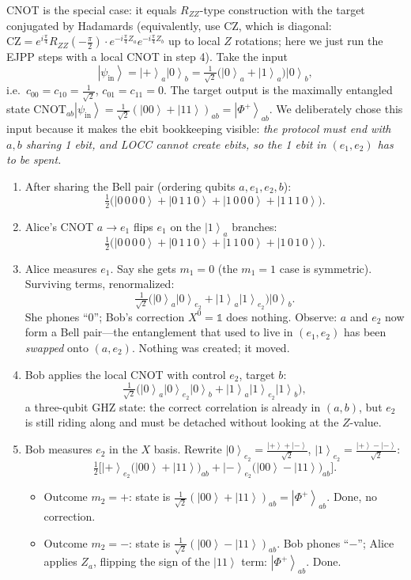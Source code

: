\documentclass[11pt]{article}
\newcommand{\ket}[1]{\left|#1\right\rangle}
\newcommand{\Phip}{\ket{\Phi^{+}}}
\newcommand{\RZZ}{R_{ZZ}}
\begin{document}
CNOT is the special case: it equals $\RZZ$-type construction with the target
conjugated by Hadamards (equivalently, use CZ, which is diagonal:
$\mathrm{CZ} = e^{i\frac{\pi}{4}} \RZZ(-\tfrac{\pi}{2})
\cdot e^{-i\frac{\pi}{4}Z_a} e^{-i\frac{\pi}{4}Z_b}$ up to local $Z$
rotations; here we just run the EJPP steps with a local CNOT in step 4).
Take the input
\[
\ket{\psi_{\text{in}}}
 = \ket{+}_a \ket{0}_b
 = \tfrac{1}{\sqrt 2}\big(\ket{0}_a + \ket{1}_a\big)\ket{0}_b ,
\]
i.e.\ $c_{00} = c_{10} = \tfrac{1}{\sqrt2}$, $c_{01} = c_{11} = 0$.
The target output is the maximally entangled state
$\mathrm{CNOT}_{ab}\ket{\psi_{\text{in}}}
 = \tfrac{1}{\sqrt2}(\ket{00}+\ket{11})_{ab} = \Phip_{ab}$.
We deliberately chose this input because it makes the ebit bookkeeping
visible: \emph{the protocol must end with $a,b$ sharing 1 ebit, and LOCC
cannot create ebits, so the 1 ebit in $(e_1,e_2)$ has to be spent.}

\begin{enumerate}[leftmargin=2em, itemsep=0.5em]
\item After sharing the Bell pair (ordering qubits $a, e_1, e_2, b$):
\[
\tfrac{1}{2}\Big(
 \ket{0\,0\,0\,0} + \ket{0\,1\,1\,0} + \ket{1\,0\,0\,0} + \ket{1\,1\,1\,0}
\Big).
\]
\item Alice's CNOT $a \to e_1$ flips $e_1$ on the $\ket{1}_a$ branches:
\[
\tfrac{1}{2}\Big(
 \ket{0\,0\,0\,0} + \ket{0\,1\,1\,0} + \ket{1\,1\,0\,0} + \ket{1\,0\,1\,0}
\Big).
\]
\item Alice measures $e_1$. Say she gets $m_1 = 0$ (the $m_1 = 1$ case is
symmetric). Surviving terms, renormalized:
\[
\tfrac{1}{\sqrt2}\Big(\ket{0}_a \ket{0}_{e_2} + \ket{1}_a \ket{1}_{e_2}\Big)\ket{0}_b .
\]
She phones ``0''; Bob's correction $X^{0} = \mathbb{1}$ does nothing.
Observe: $a$ and $e_2$ now form a Bell pair---the entanglement that used to
live in $(e_1, e_2)$ has been \emph{swapped} onto $(a, e_2)$. Nothing was
created; it moved.
\item Bob applies the local CNOT with control $e_2$, target $b$:
\[
\tfrac{1}{\sqrt2}\Big(\ket{0}_a \ket{0}_{e_2}\ket{0}_b
 + \ket{1}_a \ket{1}_{e_2}\ket{1}_b\Big),
\]
a three-qubit GHZ state: the correct correlation is already in $(a,b)$, but
$e_2$ is still riding along and must be detached without looking at the
$Z$-value.
\item Bob measures $e_2$ in the $X$ basis. Rewrite
$\ket{0}_{e_2} = \tfrac{\ket{+}+\ket{-}}{\sqrt2}$,
$\ket{1}_{e_2} = \tfrac{\ket{+}-\ket{-}}{\sqrt2}$:
\[
\tfrac{1}{2}\Big[\ket{+}_{e_2}\big(\ket{00}+\ket{11}\big)_{ab}
 + \ket{-}_{e_2}\big(\ket{00}-\ket{11}\big)_{ab}\Big].
\]
  \begin{itemize}
  \item Outcome $m_2 = +$: state is $\tfrac{1}{\sqrt2}(\ket{00}+\ket{11})_{ab}
        = \Phip_{ab}$. Done, no correction.
  \item Outcome $m_2 = -$: state is $\tfrac{1}{\sqrt2}(\ket{00}-\ket{11})_{ab}$.
        Bob phones ``$-$''; Alice applies $Z_a$, flipping the sign of the
        $\ket{11}$ term: $\Phip_{ab}$. Done.
  \end{itemize}
\end{enumerate}
\end{document}
